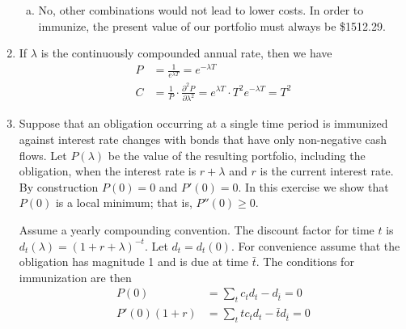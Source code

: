 \documentclass{article}
\begin{document}
\begin{enumerate}
\begin{enumerate}[(a)]
			\item 
				\begin{soln}
					No, other combinations would not lead to lower costs. In order to immunize, the present value of our portfolio must always be \$1512.29.
				\end{soln}
	
		\end{enumerate}

	\item 
				\begin{soln}
					If $\lambda$ is the continuously compounded annual rate, then we have
					\begin{align*}
						P &= \frac{1}{e^{\lambda T}} = e^{-\lambda T} \\
						C &= \frac{1}{P} \cdot \frac{\partial^2 P}{\partial\lambda^2} = e^{\lambda T}\cdot T^2 e^{-\lambda T} = T^2
					\end{align*}
				\end{soln}
				
	\item Suppose that an obligation occurring at a single time period is immunized against interest rate changes with bonds that have only non-negative cash flows. Let $P(\lambda)$ be the value of the resulting portfolio, including the obligation, when the interest rate is $r+\lambda$ and $r$ is the current interest rate. By construction $P(0)=0$ and $P'(0)=0.$ In this exercise we show that $P(0)$ is a local minimum; that is, $P''(0)\ge0.$

		Assume a yearly compounding convention. The discount factor for time $t$ is $d_t(\lambda)=(1+r+\lambda)^{-t}.$ Let $d_t=d_t(0).$ For convenience assume that the obligation has magnitude 1 and is due at time $\bar{t}.$ The conditions for immunization are then
		\begin{align*}
			P(0) &= \sum_{t}^{}c_td_t-d_{\bar{t}} = 0 \\
			P'(0)(1+r) &= \sum_{t}^{}tc_td_t - \bar{t}d_{\bar{t}} = 0
		\end{align*}


\end{enumerate}
\end{document}
